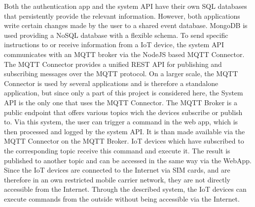 \documentclass[12pt, a4paper]{article}
\begin{document}
        Both the authentication app and the system \ac{API} have their own SQL databases that persistently provide the relevant information. However, both applications write certain changes made by the user to a shared event database. MongoDB is used providing a NoSQL database with a flexible schema. To send specific instructions to or receive information from a \ac{IoT} device, the system \ac{API} communicates with an MQTT broker via the NodeJS based MQTT Connector. The MQTT Connector provides a unified REST API for publishing and subscribing messages over the MQTT protocol. On a larger scale, the MQTT Connector is used by several applications and is therefore a standalone application, but since only a part of this project is considered here, the System API is the only one that uses the MQTT Connector. The MQTT Broker is a public endpoint that offers various topics wich the devices subscribe or publish to. Via this system, the user can trigger a command in the web app, which is then processed and logged by the system API. It is than made available via the MQTT Connector on the MQTT Broker. IoT devices which have subscribed to the corresponding topic receive this command and execute it. The result is published to another topic and can be accessed in the same way via the WebApp. Since the IoT devices are connected to the Internet via SIM cards, and are therefore in an own restricted mobile carrier network, they are not directly accessible from the Internet. Through the described system, the IoT devices can execute commands from the outside without being accessible via the Internet.
\end{document}
